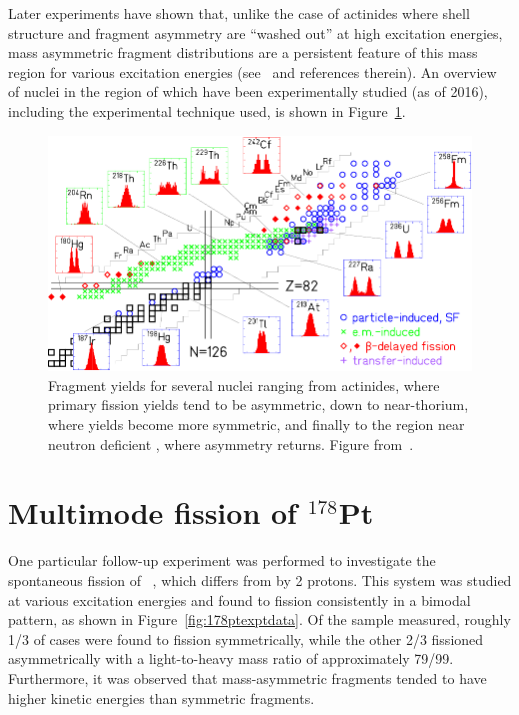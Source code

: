 Later experiments have shown that, unlike the case of actinides where shell structure and fragment asymmetry are ``washed out'' at high excitation energies, mass asymmetric fragment distributions are a persistent feature of this mass region for various excitation energies (see~\cite{Andreyev2018} and references therein). An overview of nuclei in the region of {\Hg} which have been experimentally studied (as of 2016), including the experimental technique used, is shown in Figure~\ref{fig:178ptregion}.

\begin{figure}
	\centering
	\includegraphics[width=0.9\linewidth]{./TeX_files/178Pt_region}
	\caption[Survey of fragment yields near $^{180}$Hg]{Fragment yields for several nuclei ranging from actinides, where primary fission yields tend to be asymmetric, down to near-thorium, where yields become more symmetric, and finally to the region near neutron deficient {\Hg}, where asymmetry returns. Figure from~\cite{Andreyev2018}.}
	\label{fig:178ptregion}
\end{figure}



\section{Multimode fission of $^{178}$Pt}

One particular follow-up experiment was performed to investigate the spontaneous fission of {\Pt}~\cite{Tsekhanovich2019}, which differs from {\Hg} by 2 protons. This system was studied at various excitation energies and found to fission consistently in a bimodal pattern, as shown in Figure~\ref{fig:178ptexptdata}. Of the sample measured, roughly 1/3 of cases were found to fission symmetrically, while the other 2/3 fissioned asymmetrically with a light-to-heavy mass ratio of approximately 79/99. Furthermore, it was observed that mass-asymmetric fragments tended to have higher kinetic energies than symmetric fragments.

